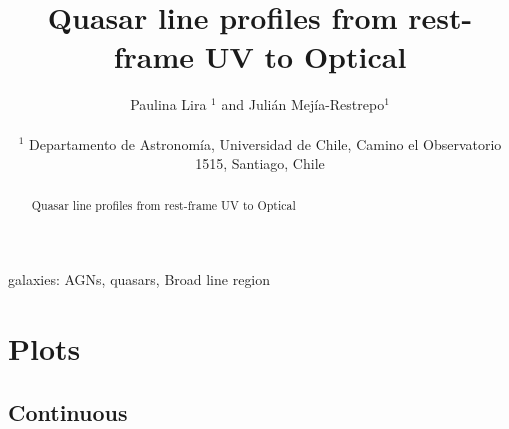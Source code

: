 \documentclass[usenatbib]{mn2e}
\begin{document}
\title[Quasar line profiles from  rest-frame UV to Optical]{Quasar line profiles from rest-frame UV to Optical}    
\author[P. Lira and J.E. Mejia-Restrepo]{
\parbox[t]{\textwidth}{\raggedright 
Paulina Lira $^{1}$ and
Juli\'an Mej\'ia-Restrepo$^{1}$ 
}
\vspace*{6pt}\\
$^{1}$ Departamento de Astronom\'{i}a, Universidad de Chile, Camino el
Observatorio 1515, Santiago, Chile} 

\maketitle

\begin{abstract}
 Quasar line profiles from  rest-frame UV to Optical 
\end{abstract}

\begin{keywords}
{galaxies: AGNs, quasars, Broad line region} 
\end{keywords}


\section{Plots}

\subsection{Continuous}
\end{document}
